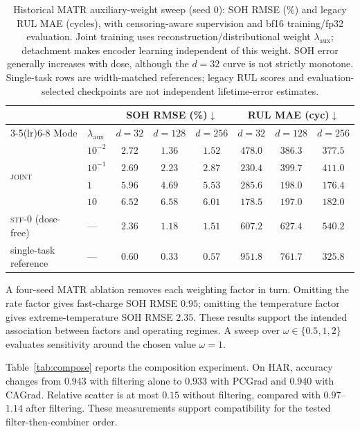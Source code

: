 \documentclass{article}
\begin{document}
\begin{table}[t]
\centering
\caption{Historical MATR auxiliary-weight sweep (seed 0): SOH RMSE (\%) and legacy RUL MAE (cycles), with censoring-aware supervision and bf16 training/fp32 evaluation. Joint training uses reconstruction/distributional weight $\lambda_{\mathrm{aux}}$; detachment makes encoder learning independent of this weight. SOH error generally increases with dose, although the $d=32$ curve is not strictly monotone. Single-task rows are width-matched references; legacy RUL scores and evaluation-selected checkpoints are not independent lifetime-error estimates.}
\label{tab:aux_sweep}
\footnotesize
\begin{tabular}{ll ccc ccc}
\toprule
& & \multicolumn{3}{c}{SOH RMSE (\%)$\downarrow$} & \multicolumn{3}{c}{RUL MAE (cyc)$\downarrow$} \\
\cmidrule(lr){3-5}\cmidrule(lr){6-8}
Mode & $\lambda_{\mathrm{aux}}$ & $d{=}32$ & $d{=}128$ & $d{=}256$ & $d{=}32$ & $d{=}128$ & $d{=}256$ \\
\midrule
\multirow{4}{*}{\textsc{joint}} & $10^{-2}$ & $2.72$ & $1.36$ & $1.52$ & $478.0$ & $386.3$ & $377.5$ \\
& $10^{-1}$ & $2.69$ & $2.23$ & $2.87$ & $230.4$ & $399.7$ & $411.0$ \\
& $1$ & $5.96$ & $4.69$ & $5.53$ & $285.6$ & $198.0$ & $176.4$ \\
& $10$ & $6.52$ & $6.58$ & $6.01$ & $178.5$ & $197.0$ & $182.0$ \\
\midrule
\textsc{stf-0} (dose-free) & --- & $2.36$ & $1.18$ & $1.51$ & $607.2$ & $627.4$ & $540.2$ \\
\midrule
single-task reference & --- & $0.60$ & $0.33$ & $0.57$ & $951.8$ & $761.7$ & $325.8$ \\
\bottomrule
\end{tabular}
\end{table}

A four-seed MATR ablation removes each weighting factor in turn. Omitting the rate factor gives fast-charge SOH RMSE $0.95$; omitting the temperature factor gives extreme-temperature SOH RMSE $2.35$. These results support the intended association between factors and operating regimes. A sweep over $\omega\in\{0.5,1,2\}$ evaluates sensitivity around the chosen value $\omega=1$.

Table~\ref{tab:compose} reports the composition experiment. On HAR, accuracy changes from $0.943$ with filtering alone to $0.933$ with PCGrad and $0.940$ with CAGrad. Relative scatter is at most $0.15$ without filtering, compared with $0.97$--$1.14$ after filtering. These measurements support compatibility for the tested filter-then-combiner order.
\end{document}
